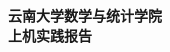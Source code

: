 \documentclass[UTF8, a4paper, zihao=-4, bibliography=totoc]{ctexrep}
\begin{document}
\begin{center}
    { \bf 云南大学数学与统计学院}\\
    { \bf 上机实践报告}
\end{center}

\end{document}
